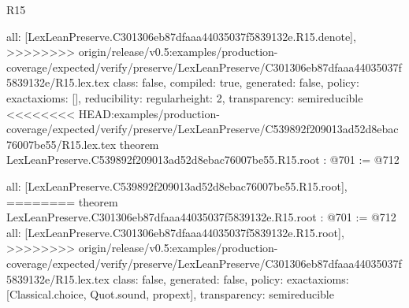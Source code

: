 \begin{lexlean}{R15}
\begin{coremodule}
{{{{{  all: [LexLeanPreserve.C301306eb87dfaaa44035037f5839132e.R15.denote],
>>>>>>>> origin/release/v0.5:examples/production-coverage/expected/verify/preserve/LexLeanPreserve/C301306eb87dfaaa44035037f5839132e/R15.lex.tex
  class: false,
  compiled: true,
  generated: false,
  policy: exact{axioms: []},
  reducibility: regular{height: 2},
  transparency: semireducible
}
<<<<<<<< HEAD:examples/production-coverage/expected/verify/preserve/LexLeanPreserve/C539892f209013ad52d8ebac76007be55/R15.lex.tex
theorem LexLeanPreserve.C539892f209013ad52d8ebac76007be55.R15.root : @701 := @712 {
  all: [LexLeanPreserve.C539892f209013ad52d8ebac76007be55.R15.root],
========
theorem LexLeanPreserve.C301306eb87dfaaa44035037f5839132e.R15.root : @701 := @712 {
  all: [LexLeanPreserve.C301306eb87dfaaa44035037f5839132e.R15.root],
>>>>>>>> origin/release/v0.5:examples/production-coverage/expected/verify/preserve/LexLeanPreserve/C301306eb87dfaaa44035037f5839132e/R15.lex.tex
  class: false,
  generated: false,
  policy: exact{axioms: [Classical.choice, Quot.sound, propext]},
  transparency: semireducible
}

}}}}}
\end{coremodule}
\end{lexlean}
